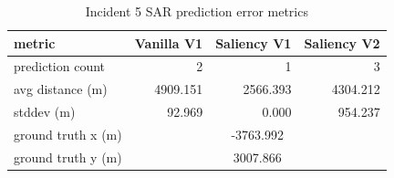\begin{table}[ht]
\centering
\caption{Incident 5 SAR prediction error metrics}
\label{tab:sar-incident-5}
\begin{tabular}{lrrr}
\hline
metric & Vanilla V1 & Saliency V1 & Saliency V2 \\
\hline
prediction count & 2 & 1 & 3 \\
avg distance (m) & 4909.151 & 2566.393 & 4304.212 \\
stddev (m) & 92.969 & 0.000 & 954.237 \\
ground truth x (m) & \multicolumn{3}{c}{-3763.992} \\
ground truth y (m) & \multicolumn{3}{c}{3007.866} \\
\hline
\end{tabular}
\end{table}
